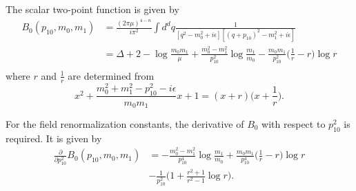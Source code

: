 The scalar two-point function is given by 
\begin{align}
B_0(p_{10},m_0,m_1)&=\frac{{(2\pi\mu)}^{4-n}}{i\pi^2}\int d^d q\frac{1}{[q^2-m_0^2+i\epsilon][(q+p_{10})^2-m_1^2+i\epsilon]}\nonumber\\
&=\Delta+2-\log\frac{m_0m_1}{\mu}+\frac{m^2_0-m^2_1}{p^2_{10}}\log\frac{m_1}{m_0}-\frac{m_0m_1}{p^2_{10}}\biggl(\frac{1}{r}-r\biggr)\log r\nonumber\\
\end{align}
where $r$ and $\frac{1}{r}$ are determined from 
\begin{equation}
x^2+\frac{m_0^2+m_1^2-p^2_{10}-i\epsilon}{m_0m_1}x+1=(x+r)\bigg(x+\frac{1}{r}\bigg).
\end{equation}

For the field renormalization constants, the derivative of $B_0$ with respect to $p_{10}^2$ is required. It is given by
\begin{align}
\frac{\partial}{\partial p_{10}^2}B_0(p_{10},m_0,m_1)&=-\frac{m_0^2-m_1^2}{p^4_{10}}\log\frac{m_1}{m_0}+\frac{m_0m_1}{p^4_{10}}\biggl(\frac{1}{r}-r\biggr)\log r\nonumber\\
&-\frac{1}{p^2_{10}}\biggl(1+\frac{r^2+1}{r^2-1}\log r \biggr).
\end{align} 

